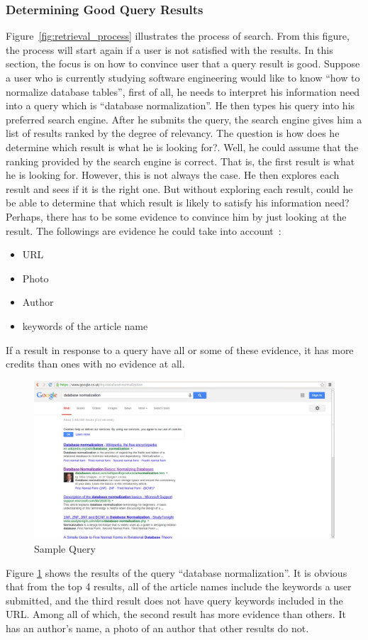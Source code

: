 \subsubsection{Determining Good Query Results}
Figure~\ref{fig:retrieval_process} illustrates the process of search. From this figure, the process will start again if a user is not satisfied with 
the results. In this section, the focus is on how to convince user that a query result is good. Suppose a user who is currently studying software engineering
would like to know ``how to normalize database tables'', first of all, he needs to interpret his information need into a query which is ``database normalization''.
He then types his query into his preferred search engine. After he submits the query, the search engine gives him a list of results ranked by the degree
of relevancy. The question is how does he determine which result is what he is looking for?. Well, he could assume that the ranking provided by the search 
engine is correct. That is, the first result is what he is looking for. However, this is not always the case. He then explores each result and sees if 
it is the right one. But without exploring each result, could he be able to determine that which result is likely to satisfy his information need?
Perhaps, there has to be some evidence to convince him by just looking at the result. The followings are evidence he could take into account~\cite{craig}: 
\begin{itemize}
 \item URL
 \item Photo
 \item Author
 \item keywords of the article name
\end{itemize}
If a result in response to a query have all or some of these evidence, it has more credits than ones with no evidence at all. 
\begin{figure}
\centering
\includegraphics[scale=0.3]{./figures/query.png}
\caption{Sample Query} \label{fig:query}
\end{figure}
Figure \ref{fig:query} shows the results of the query ``database normalization''. It is obvious that from the top 4 results, all of the article names
include the keywords a user submitted, and the third result does not have query keywords included in the URL. Among all of which, the second result has more 
evidence than others. It has an author's name, a photo of an author that other results do not.

